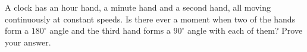 A clock has an hour hand, a minute hand and a second hand, all moving continuously at constant speeds. Is there ever a moment when two of the hands form a $180^\circ$ angle and the third hand forms a $90^\circ$ angle with each of them? Prove your answer.
